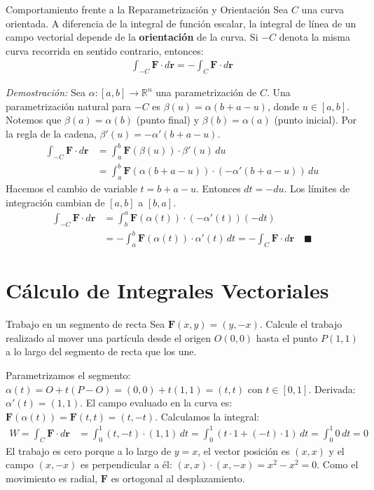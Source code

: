 \documentclass[11pt,a4paper]{article}
\begin{document}
\begin{teoremabox}{Comportamiento frente a la Reparametrización y Orientación}
Sea $C$ una curva orientada. A diferencia de la integral de función escalar, la integral de línea de un campo vectorial depende de la \textbf{orientación} de la curva. Si $-C$ denota la misma curva recorrida en sentido contrario, entonces:
\begin{align*}
\int_{-C} \mathbf{F} \cdot d\mathbf{r} = - \int_C \mathbf{F} \cdot d\mathbf{r}
\end{align*}

\textit{Demostración:}
Sea $\alpha: [a,b] \to \mathbb{R}^n$ una parametrización de $C$. Una parametrización natural para $-C$ es $\beta(u) = \alpha(b+a-u)$, donde $u \in [a,b]$. Notemos que $\beta(a) = \alpha(b)$ (punto final) y $\beta(b) = \alpha(a)$ (punto inicial).
Por la regla de la cadena, $\beta'(u) = -\alpha'(b+a-u)$.
\begin{align*}
\int_{-C} \mathbf{F} \cdot d\mathbf{r} &= \int_a^b \mathbf{F}(\beta(u)) \cdot \beta'(u) \, du \\
&= \int_a^b \mathbf{F}(\alpha(b+a-u)) \cdot (-\alpha'(b+a-u)) \, du
\end{align*}
Hacemos el cambio de variable $t = b+a-u$. Entonces $dt = -du$. Los límites de integración cambian de $[a,b]$ a $[b,a]$.
\begin{align*}
\int_{-C} \mathbf{F} \cdot d\mathbf{r} &= \int_b^a \mathbf{F}(\alpha(t)) \cdot (-\alpha'(t)) (-dt) \\
&= - \int_a^b \mathbf{F}(\alpha(t)) \cdot \alpha'(t) \, dt = - \int_C \mathbf{F} \cdot d\mathbf{r} \quad \blacksquare
\end{align*}
\end{teoremabox}

\section{Cálculo de Integrales Vectoriales}

\begin{ejemplobox}{Trabajo en un segmento de recta}
Sea $\mathbf{F}(x,y) = (y, -x)$. Calcule el trabajo realizado al mover una partícula desde el origen $O(0,0)$ hasta el punto $P(1,1)$ a lo largo del segmento de recta que los une.

Parametrizamos el segmento: $\alpha(t) = O + t(P-O) = (0,0) + t(1,1) = (t, t)$ con $t \in [0,1]$.
Derivada: $\alpha'(t) = (1, 1)$.
El campo evaluado en la curva es: $\mathbf{F}(\alpha(t)) = \mathbf{F}(t, t) = (t, -t)$.
Calculamos la integral:
\begin{align*}
W = \int_C \mathbf{F} \cdot d\mathbf{r} &= \int_0^1 (t, -t) \cdot (1, 1) \, dt = \int_0^1 (t\cdot 1 + (-t)\cdot 1) \, dt = \int_0^1 0 \, dt = 0
\end{align*}
El trabajo es cero porque a lo largo de $y=x$, el vector posición es $(x,x)$ y el campo $(x, -x)$ es perpendicular a él: $(x,x)\cdot(x,-x) = x^2-x^2=0$. Como el movimiento es radial, $\mathbf{F}$ es ortogonal al desplazamiento.
\end{ejemplobox}
\end{document}
